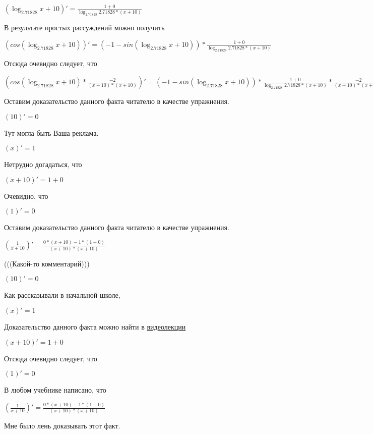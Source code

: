 \documentclass[12pt,a4paper,fleqn]{article}
\theoremstyle{definition}
\begin{document}
$(\log_{ 2.71828 }{ x  +  10 })' = \frac{ 1  +  0 }{\log_{ 2.71828 }{ 2.71828 } * ( x  +  10 )}
$

В результате простых рассуждений можно получить

$(cos(\log_{ 2.71828 }{ x  +  10 }))' = ( -1  - sin(\log_{ 2.71828 }{ x  +  10 })) * \frac{ 1  +  0 }{\log_{ 2.71828 }{ 2.71828 } * ( x  +  10 )}
$

Отсюда очевидно следует, что

$(cos(\log_{ 2.71828 }{ x  +  10 }) * \frac{ -2 }{( x  +  10 ) * ( x  +  10 )}
)' = ( -1  - sin(\log_{ 2.71828 }{ x  +  10 })) * \frac{ 1  +  0 }{\log_{ 2.71828 }{ 2.71828 } * ( x  +  10 )}
 * \frac{ -2 }{( x  +  10 ) * ( x  +  10 )}
 + cos(\log_{ 2.71828 }{ x  +  10 }) * \frac{ 0  * ( x  +  10 ) * ( x  +  10 ) -  -2  * (( 1  +  0 ) * ( x  +  10 ) + ( x  +  10 ) * ( 1  +  0 ))}{( x  +  10 ) * ( x  +  10 ) * ( x  +  10 ) * ( x  +  10 )}
$

Оставим доказательство данного факта читателю в качестве упражнения.

$( 10 )' =  0 $

Тут могла быть Ваша реклама.

$( x )' =  1 $

Нетрудно догадаться, что

$( x  +  10 )' =  1  +  0 $

Очевидно, что

$( 1 )' =  0 $

Оставим доказательство данного факта читателю в качестве упражнения.

$(\frac{ 1 }{ x  +  10 }
)' = \frac{ 0  * ( x  +  10 ) -  1  * ( 1  +  0 )}{( x  +  10 ) * ( x  +  10 )}
$

(((Какой-то комментарий)))

$( 10 )' =  0 $

Как рассказывали в начальной школе,

$( x )' =  1 $

Доказательство данного факта можно найти в \href{https://www.youtube.com/watch?v=dQw4w9WgXcQ}{видеолекции}

$( x  +  10 )' =  1  +  0 $

Отсюда очевидно следует, что

$( 1 )' =  0 $

В любом учебнике написано, что

$(\frac{ 1 }{ x  +  10 }
)' = \frac{ 0  * ( x  +  10 ) -  1  * ( 1  +  0 )}{( x  +  10 ) * ( x  +  10 )}
$

Мне было лень доказывать этот факт.
\end{document}

